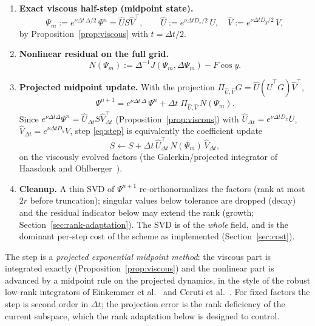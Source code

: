 \begin{enumerate}
  \item \textbf{Exact viscous half-step (midpoint state).}
  \begin{equation}
    \Psi_m := e^{\nu \Delta t\, \Delta / 2}\, \Psi^n
    = \hat U S \hat V^{\top},
    \qquad
    \hat U := e^{\nu \Delta t D_x/2}\, U,
    \quad
    \hat V := e^{\nu \Delta t D_y/2}\, V,
    \label{eq:midpoint}
  \end{equation}
  by Proposition~\ref{prop:viscous} with $t = \Delta t/2$.
  \item \textbf{Nonlinear residual on the full grid.}
  \begin{equation}
    N(\Psi_m) := \Delta^{-1} J(\Psi_m, \Delta \Psi_m) - F \cos y.
    \label{eq:nonlin}
  \end{equation}
  \item \textbf{Projected midpoint update.} With the projection
  $\Pi_{\hat U, \hat V} G = \hat U (\hat U^{\top} G) \hat V^{\top}$,
  \begin{equation}
    \Psi^{n+1}
    =
    e^{\nu \Delta t\, \Delta}\, \Psi^n
    + \Delta t \; \Pi_{\hat U, \hat V}\, N(\Psi_m).
    \label{eq:step}
  \end{equation}
  Since $e^{\nu \Delta t \Delta} \Psi^n = \hat U_{\Delta t} S
  \hat V_{\Delta t}^{\top}$ (Proposition~\ref{prop:viscous}) with
  $\hat U_{\Delta t} = e^{\nu \Delta t D_x} U$,
  $\hat V_{\Delta t} = e^{\nu \Delta t D_y} V$, step \eqref{eq:step} is
  equivalently the coefficient update
  \begin{equation}
    S \leftarrow S + \Delta t\, \hat U_{\Delta t}^{\top}\,
    N(\Psi_m)\, \hat V_{\Delta t},
    \label{eq:s-update}
  \end{equation}
  on the viscously evolved factors (the Galerkin/projected integrator of
  Haasdonk and Ohlberger~\cite{haasdonk2012}).
  \item \textbf{Cleanup.} A thin SVD of $\Psi^{n+1}$ re-orthonormalizes the
  factors (rank at most $2r$ before truncation); singular values below
  tolerance are dropped (decay) and the residual indicator below may extend
  the rank (growth; Section~\ref{sec:rank-adaptation}). The SVD is of the
  \emph{whole} field, and is the dominant per-step cost of the scheme as
  implemented (Section~\ref{sec:cost}).
\end{enumerate}

The step is a \emph{projected exponential midpoint method}: the viscous part
is integrated exactly (Proposition~\ref{prop:viscous}) and the nonlinear part
is advanced by a midpoint rule on the projected dynamics, in the style of the
robust low-rank integrators of Einkemmer et al.~\cite{einkemmer2023} and
Ceruti et al.~\cite{ceruti2024}. For fixed factors the step is second order
in $\Delta t$; the projection error is the rank deficiency of the current
subspace, which the rank adaptation below is designed to control.

